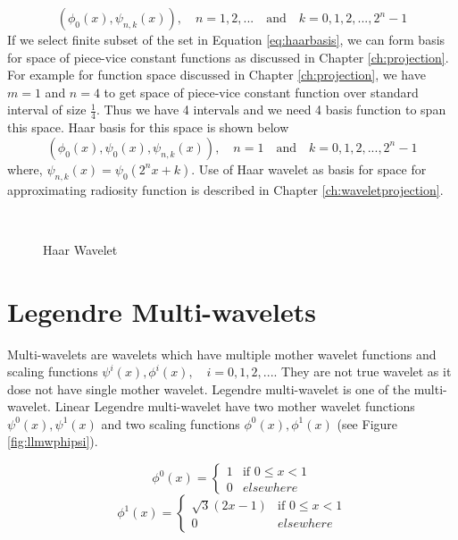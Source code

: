 \begin{equation}\label{eq:haarbasis}
(\phi_0(x),\psi_{n,k}(x)),\quad  n= 1, 2,...\quad  \text{and} \quad k=0,1,2,...,2^n-1
\end{equation}
If we select finite subset of the set in Equation \ref{eq:haarbasis}, we can form basis for space of piece-vice constant functions as discussed in Chapter \ref{ch:projection}. For example for function space discussed in Chapter \ref{ch:projection}, we have $m=1$ and $n=4$ to get space of piece-vice constant function over standard interval of size $\frac{1}{4}$. Thus we have 4 intervals and we need 4 basis function to span this space. Haar basis for this space is shown below
\begin{equation}\label{eq:haarbasis_n4}
(\phi_0(x),\psi_0(x),\psi_{n,k}(x)),\quad n= 1 \quad \text{and} \quad k=0,1,2,...,2^n-1
\end{equation}
where, $\psi_{n,k}(x)=\psi_{0}(2^n x+k)$.
Use of Haar wavelet as basis for space for approximating radiosity function is described in Chapter \ref{ch:waveletprojection}.



\begin{figure*}
\centering
{}
\\
\caption{Haar Wavelet}
\label{fig:haarphipsi}
\end{figure*}


 

 \section{Legendre Multi-wavelets}
Multi-wavelets are wavelets which have multiple mother wavelet  functions and scaling functions $\psi^i(x), \phi^i(x),\quad i=0,1,2,...$. They are not true wavelet as it dose not have single mother wavelet. Legendre multi-wavelet is one of the multi-wavelet. Linear Legendre multi-wavelet have two mother wavelet functions $\psi^0(x), \psi^1(x)$ and two scaling functions $\phi^0(x), \phi^1(x)$ (see Figure \ref{fig:llmwphipsi}). 

\begin{equation}
\phi^0(x)=
\left\{
    \begin{array}{ll}
        1  & \mbox{if } 0 \leq x < 1 \\
        0 & elsewhere
    \end{array}
\right.
\end{equation}
\begin{equation}
\phi^1(x)=
\left\{
    \begin{array}{ll}
        \sqrt{3}(2x-1)  & \mbox{if } 0 \leq x < 1 \\
        0 & elsewhere
    \end{array}
\right.
\end{equation}

